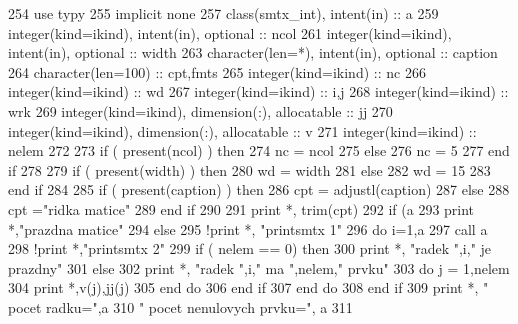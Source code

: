 \begin{DoxyCode}
254         \textcolor{keywordtype}{use }typy
255         \textcolor{keywordtype}{implicit none}
257         \textcolor{keywordtype}{class}(smtx\_int), \textcolor{keywordtype}{intent(in)} :: a
259         \textcolor{keywordtype}{integer(kind=ikind)}, \textcolor{keywordtype}{intent(in)}, \textcolor{keywordtype}{optional} :: ncol
261         \textcolor{keywordtype}{integer(kind=ikind)}, \textcolor{keywordtype}{intent(in)}, \textcolor{keywordtype}{optional} :: width
263         \textcolor{keywordtype}{character(len=*)}, \textcolor{keywordtype}{intent(in)},    \textcolor{keywordtype}{optional} :: caption
264         \textcolor{keywordtype}{character(len=100)} :: cpt,fmts
265         \textcolor{keywordtype}{integer(kind=ikind)} :: nc
266         \textcolor{keywordtype}{integer(kind=ikind)} :: wd
267         \textcolor{keywordtype}{integer(kind=ikind)} :: i,j
268         \textcolor{keywordtype}{integer(kind=ikind)} :: wrk
269         \textcolor{keywordtype}{integer(kind=ikind)}, \textcolor{keywordtype}{dimension(:)}, \textcolor{keywordtype}{allocatable} :: jj
270         \textcolor{keywordtype}{integer(kind=ikind)}, \textcolor{keywordtype}{dimension(:)}, \textcolor{keywordtype}{allocatable} :: v
271         \textcolor{keywordtype}{integer(kind=ikind)} :: nelem
272 
273         \textcolor{keywordflow}{if} ( \textcolor{keyword}{present}(ncol) ) then
274             nc = ncol
275         else
276             nc = 5
277 \textcolor{keyword}{        end }if
278 
279         \textcolor{keywordflow}{if} ( \textcolor{keyword}{present}(width) ) then
280             wd = width
281         else
282             wd = 15
283 \textcolor{keyword}{        end }if
284 
285         \textcolor{keywordflow}{if} ( \textcolor{keyword}{present}(caption) ) then
286             cpt = adjustl(caption)
287         else
288             cpt =\textcolor{stringliteral}{"ridka matice"}
289 \textcolor{keyword}{        end }if
290 
291         print *, trim(cpt)
292         \textcolor{keywordflow}{if} (a%
293             print *,\textcolor{stringliteral}{"prazdna matice"}
294         else
295             \textcolor{comment}{!print *, "printsmtx 1"
}
296             \textcolor{keywordflow}{do} i=1,a%
297                 \textcolor{keyword}{call }a%
298                 \textcolor{comment}{!print *,"printsmtx 2"
}
299                 \textcolor{keywordflow}{if} ( nelem == 0) then
300                     print *, \textcolor{stringliteral}{"radek "},i,\textcolor{stringliteral}{" je prazdny"}
301                 else
302                     print *, \textcolor{stringliteral}{"radek "},i,\textcolor{stringliteral}{" ma "},nelem,\textcolor{stringliteral}{" prvku"}
303                     \textcolor{keywordflow}{do} j = 1,nelem
304                         print *,v(j),jj(j)
305 \textcolor{keyword}{                    end }do
306 \textcolor{keyword}{                end }if
307 \textcolor{keyword}{            end }do
308 \textcolor{keyword}{        end }if
309         print *, \textcolor{stringliteral}{" pocet radku="},a%
310             \textcolor{stringliteral}{" pocet nenulovych prvku="}, a%
311 
\end{DoxyCode}
